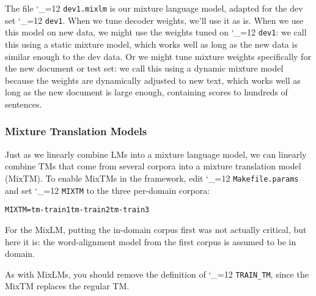 \documentclass[11pt,letterpaper]{article}
\def\code{\begingroup\catcode`\_=12 \codex}
\newcommand{\codex}[1]{\texttt{#1}\endgroup}
\begin{document}
The file \code{dev1.mixlm} is our mixture language model, adapted for the
dev set \code{dev1}.  When we tune decoder weights, we'll use it as is.  When
we use this model on new data, we might use the weights tuned on
\code{dev1}: we call this using a static mixture model, which works well as
long as the new data is similar enough to the dev data.  Or we might tune
mixture weights specifically for the new document or test set: we call this
using a dynamic mixture model because the weights are dynamically adjusted to
new text, which works well as long as the new document is large enough,
containing scores to hundreds of sentences.

\subsubsection{Mixture Translation Models} \label{MIXTM}

Just as we linearly combine LMs into a mixture language model, we can linearly
combine TMs that come from several corpora into a mixture translation model
(MixTM).  To enable MixTMs in the framework, edit \code{Makefile.params} and
set \code{MIXTM} to the three per-domain corpora:
\begin{small}
\begin{alltt}
   MIXTM = tm-train1 tm-train2 tm-train3
\end{alltt}
\end{small}

For the MixLM, putting the in-domain corpus first was not actually critical,
but here it is: the word-alignment model from the first corpus is assumed to be
in domain.

As with MixLMs, you should remove the definition of \code{TRAIN_TM}, since the
MixTM replaces the regular TM.
\end{document}
